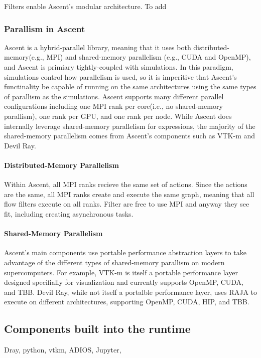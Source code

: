 Filters enable Ascent's modular architecture.
%
To add

\subsubsection{Parallism in Ascent}
Ascent is a hybrid-parallel library, meaning that it uses both
distributed-memory(e.g., MPI) and shared-memory parallelism
(e.g., CUDA and OpenMP), and Ascent is primiary
tightly-coupled with simulations.
%
In this paradigm, simulations control how parallelism is used, so
it is imperitive that Ascent's functinality be capable of running
on the same architectures using the same types of parallism as the
simulations.
%
Ascent supports many different parallel configurations including
one MPI rank per core(i.e., no shared-memory parallism), one rank
per GPU, and one rank per node.
%
While Ascent does internally leverage shared-memory parallelism
for expressions, the majority of the shared-memory parallelism comes
from Ascent's components such as VTK-m and Devil Ray.

\paragraph{Distributed-Memory Parallelism}
Within Ascent, all MPI ranks recieve the same set of actions.
%
Since the actions are the same, all MPI ranks create and execute the same graph,
meaning
that all flow filters execute on all ranks.
%
Filter are free to use MPI and anyway they see fit, including
creating asynchronous tasks.

\paragraph{Shared-Memory Parallelism}
Ascent's main components use portable performance abstraction layers to
take advantage of the different types of shared-memory parallism on
modern supercomputers.
%
For example, VTK-m is itself a portable performance layer designed specifially
for visualization and currently supports OpenMP, CUDA, and TBB.
%
Devil Ray, while not itself a portalble performance layer, uses RAJA to execute
on different architectures, supporting OpenMP, CUDA, HIP, and TBB.

\subsection{Components built into the runtime}
Dray, python, vtkm, ADIOS, Jupyter,


